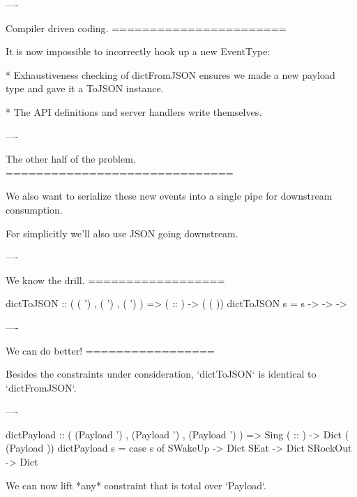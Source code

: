 ----

Compiler driven coding.
=======================

It is now impossible to incorrectly hook up a new EventType:

* Exhaustiveness checking of dictFromJSON ensures we made a new payload type and gave it a ToJSON instance.

* The API definitions and server handlers write themselves.

----

The other half of the problem.
==============================

We also want to serialize these new events into a single pipe for downstream consumption.

For simplicitly we'll also use JSON going downstream.

----

We know the drill.
==================

\begin{custom}
  dictToJSON :: (  ( ')
                ,  ( ')
                ,  ( ')
                )
             =>  ( :: )
             ->  ( ( ))
  dictToJSON s =  s 
      -> 
         -> 
     -> 
\end{custom}

----

We can do better!
=================

Besides the constraints under consideration, `dictToJSON` is identical to `dictFromJSON`.

----

\begin{raw}

  dictPayload :: (  (Payload ')
                 ,  (Payload ')
                 ,  (Payload ')
                 )
              => Sing ( :: )
              -> Dict ( (Payload ))
  dictPayload s = case s of
    SWakeUp  -> Dict
    SEat     -> Dict
    SRockOut -> Dict
\end{raw}

We can now lift *any* constraint that is total over `Payload`.

